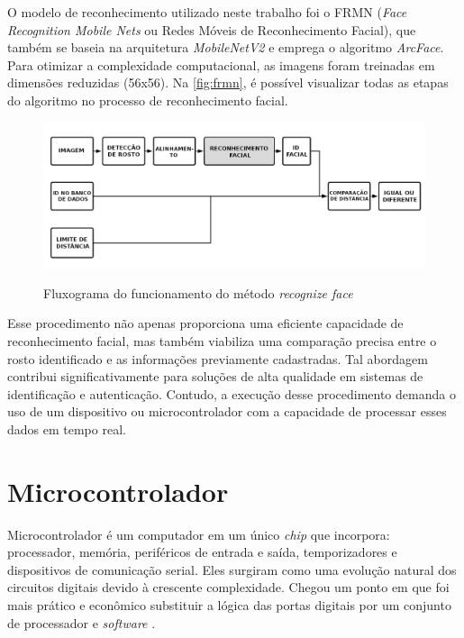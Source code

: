 O modelo de reconhecimento utilizado neste trabalho foi o FRMN 
(\textit{Face Recognition Mobile Nets} ou Redes Móveis de Reconhecimento Facial), que 
também se baseia na arquitetura \textit{MobileNetV2} e emprega o 
algoritmo \textit{ArcFace}. Para otimizar a complexidade computacional, 
as imagens foram treinadas em dimensões reduzidas (56x56). 
Na \autoref{fig:frmn}, 
é possível visualizar todas as etapas do algoritmo 
no processo de reconhecimento facial.

\begin{figure}[h!]
    \centering
    \caption{Fluxograma do funcionamento do método \textit{recognize face}}
    \includegraphics[scale=0.28]{figuras/face-recognition.png}
    \label{fig:frmn}
    \centering
\end{figure}


Esse procedimento não apenas proporciona uma eficiente capacidade de 
reconhecimento facial, mas também viabiliza uma comparação precisa entre 
o rosto identificado e as informações previamente cadastradas. Tal abordagem 
contribui significativamente para soluções de alta qualidade em sistemas de 
identificação e autenticação. Contudo, a execução desse procedimento demanda 
o uso de um dispositivo ou microcontrolador com a capacidade de processar 
esses dados em tempo real. 

\section{Microcontrolador}\label{sec:microcontrolador}

Microcontrolador é um computador em um único \textit{chip} que incorpora: processador, 
memória, periféricos de entrada e saída, temporizadores e dispositivos de 
comunicação serial. Eles surgiram como uma evolução natural dos circuitos digitais 
devido à crescente complexidade. Chegou um ponto em que foi mais prático e 
econômico substituir a lógica das portas digitais por um conjunto de 
processador e \textit{software} \cite[p. 15]{penido2013}.

